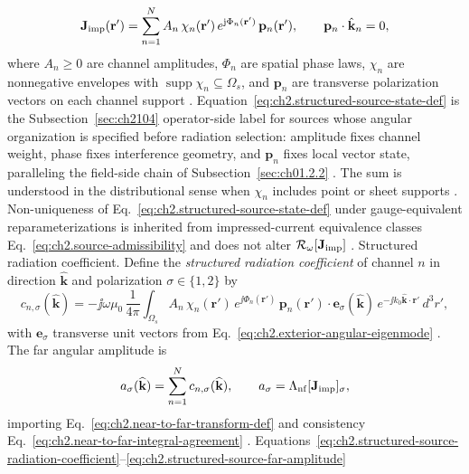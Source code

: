 \begin{equation}
\label{eq:ch2.structured-source-state-def}
\mathbf{J}_{\mathrm{imp}}(\mathbf{r}')
=
\sum_{n=1}^{N}
A_n\,\chi_n(\mathbf{r}')\,
e^{\mathrm{j}\Phi_n(\mathbf{r}')}\,
\mathbf{p}_n(\mathbf{r}'),
\qquad
\mathbf{p}_n\cdot\hat{\mathbf{k}}_n=0,
\end{equation}
where \(A_n\ge 0\) are channel amplitudes, \(\Phi_n\) are spatial phase laws,
\(\chi_n\) are nonnegative envelopes with \(\operatorname{supp}\chi_n\subseteq\Omega_s\),
and \(\mathbf{p}_n\) are transverse polarization vectors on each channel support
\cite{stratton1941}. Equation~\eqref{eq:ch2.structured-source-state-def} is the
Subsection~\ref{sec:ch2104} operator-side label for sources whose angular organization is
specified before radiation selection: amplitude fixes channel weight, phase fixes interference
geometry, and \(\mathbf{p}_n\) fixes local vector state, paralleling the field-side chain of
Subsection~\ref{sec:ch01.2.2} \cite{stratton1941}. The sum is understood in the
distributional sense when \(\chi_n\) includes point or sheet supports
\cite{stratton1941}. Non-uniqueness of Eq.~\eqref{eq:ch2.structured-source-state-def}
under gauge-equivalent reparameterizations is inherited from impressed-current equivalence classes
Eq.~\eqref{eq:ch2.source-admissibility} and does not alter \(\mathcal{R}_\omega[\mathbf{J}_{\mathrm{imp}}]\)
\cite{harrington2001}. Structured radiation coefficient. Define the \emph{structured radiation coefficient} of channel \(n\) in direction
\(\widehat{\mathbf{k}}\) and polarization \(\sigma\in\{1,2\}\) by
\begin{equation}
\label{eq:ch2.structured-source-radiation-coefficient}
c_{n,\sigma}(\widehat{\mathbf{k}})
=
-\jj\omega\mu_0\,\frac{1}{4\pi}
\int_{\Omega_s}
A_n\,\chi_n(\mathbf{r}')\,
e^{\jj\Phi_n(\mathbf{r}')}\,
\mathbf{p}_n(\mathbf{r}')\cdot\mathbf{e}_\sigma(\widehat{\mathbf{k}})\,
e^{-\jj k_0\widehat{\mathbf{k}}\cdot\mathbf{r}'}\,d^{3}r',
\end{equation}
with \(\mathbf{e}_\sigma\) transverse unit vectors from
Eq.~\eqref{eq:ch2.exterior-angular-eigenmode} \cite{stratton1941}. The far angular
amplitude is
\begin{equation}
\label{eq:ch2.structured-source-far-amplitude}
a_\sigma(\widehat{\mathbf{k}})
=
\sum_{n=1}^{N} c_{n,\sigma}(\widehat{\mathbf{k}}),
\qquad
a_\sigma=\Lambda_{\mathrm{nf}}[\mathbf{J}_{\mathrm{imp}}]_\sigma,
\end{equation}
importing Eq.~\eqref{eq:ch2.near-to-far-transform-def} and consistency
Eq.~\eqref{eq:ch2.near-to-far-integral-agreement} \cite{stratton1941}.
Equations~\eqref{eq:ch2.structured-source-radiation-coefficient}--\eqref{eq:ch2.structured-source-far-amplitude}
